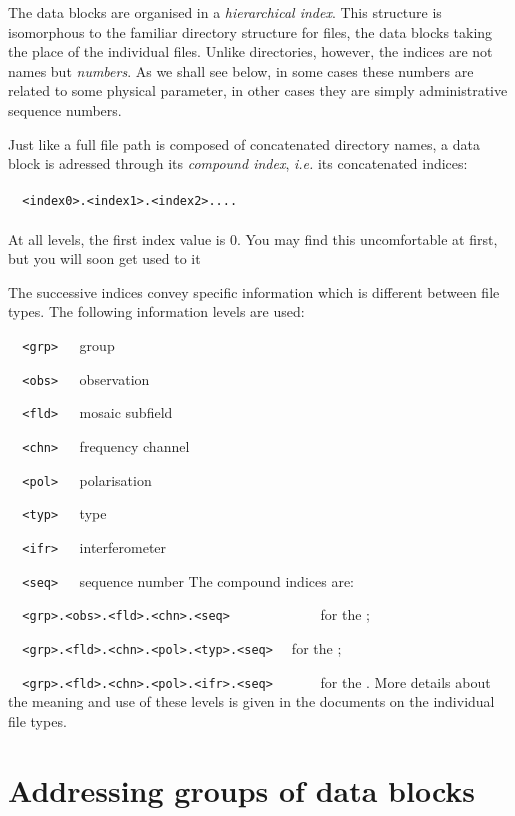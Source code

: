 	The data blocks are organised in a {\em hierarchical index}. This structure is isomorphous to the familiar directory structure for files, the data blocks taking the place of the individual files. Unlike directories, however, the indices are not names but {\em numbers}. As we shall see below, in some cases these numbers are related to some physical parameter, in other cases they are simply administrative sequence numbers.

	Just like a full file path is composed of concatenated directory names, a data block is adressed through its {\em compound index}, {\em i.e.} its concatenated indices:
\\ \\
\verb/  <index0>.<index1>.<index2>..../
\\ \\
At all levels, the first index value is 0. You may find this uncomfortable at first, but you will soon get used to it

	The successive indices convey specific information which is different between file types. The following information levels are used:
\spbegin
\bi
\item[] \verb/  <grp>   /group
\item[] \verb/  <obs>   /observation
\item[] \verb/  <fld>   /mosaic subfield
\item[] \verb/  <chn>   /frequency channel
\item[] \verb/  <pol>   /polarisation
\item[] \verb/  <typ>   /type
\item[] \verb/  <ifr>   /interferometer
\item[] \verb/  <seq>   /sequence number
\ei
\spend %
The compound indices are:
\spbegin
\bi
\item[] \verb/  <grp>.<obs>.<fld>.<chn>.<seq>       	 / for the
;
\item[] \verb/  <grp>.<fld>.<chn>.<pol>.<typ>.<seq>	 / for the ;
\item[] \verb/  <grp>.<fld>.<chn>.<pol>.<ifr>.<seq>      / for the
.
\ei
\spend More details about the meaning and use of these levels is given in the documents on the individual file types.


\section{ Addressing groups of data blocks }
\label{.addressing.groups}

